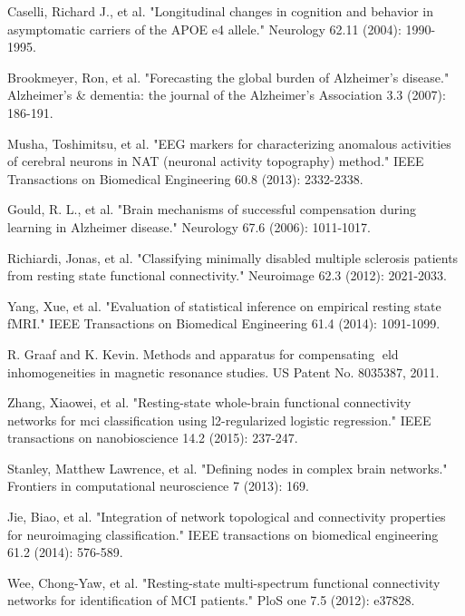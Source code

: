 \documentclass[journal]{IEEEtran}
\begin{document}
	\begin{thebibliography}{1}
		
		Caselli, Richard J., et al. "Longitudinal changes in cognition and behavior in asymptomatic carriers of the APOE e4 allele." Neurology 62.11 (2004): 1990-1995.
		
		Brookmeyer, Ron, et al. "Forecasting the global burden of Alzheimer’s disease." Alzheimer's \& dementia: the journal of the Alzheimer's Association 3.3 (2007): 186-191.
		
		Musha, Toshimitsu, et al. "EEG markers for characterizing anomalous activities of cerebral neurons in NAT (neuronal activity topography) method." IEEE Transactions on Biomedical Engineering 60.8 (2013): 2332-2338.
		
		Gould, R. L., et al. "Brain mechanisms of successful compensation during learning in Alzheimer disease." Neurology 67.6 (2006): 1011-1017.
		
		Richiardi, Jonas, et al. "Classifying minimally disabled multiple sclerosis patients from resting state functional connectivity." Neuroimage 62.3 (2012): 2021-2033.
		
		Yang, Xue, et al. "Evaluation of statistical inference on empirical resting state fMRI." IEEE Transactions on Biomedical Engineering 61.4 (2014): 1091-1099.
		
		R. Graaf and K. Kevin. Methods and apparatus for
		compensating eld inhomogeneities in magnetic resonance
		studies. US Patent No. 8035387, 2011.
		
		Zhang, Xiaowei, et al. "Resting-state whole-brain functional connectivity networks for mci classification using l2-regularized logistic regression." IEEE transactions on nanobioscience 14.2 (2015): 237-247.
		
		Stanley, Matthew Lawrence, et al. "Defining nodes in complex brain networks." Frontiers in computational neuroscience 7 (2013): 169.
		
		Jie, Biao, et al. "Integration of network topological and connectivity properties for neuroimaging classification." IEEE transactions on biomedical engineering 61.2 (2014): 576-589.
		
		Wee, Chong-Yaw, et al. "Resting-state multi-spectrum functional connectivity networks for identification of MCI patients." PloS one 7.5 (2012): e37828.
		

\end{thebibliography}
\end{document}
